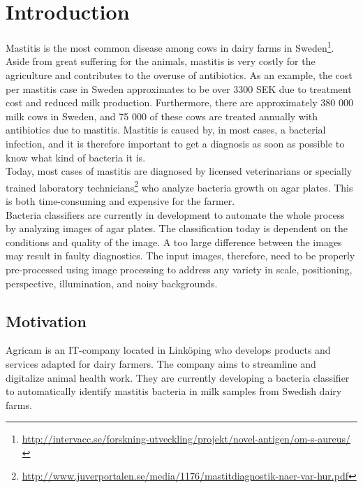 \chapter{Introduction}
Mastitis is the most common disease among cows in dairy farms in Sweden\footnote{\url{http://intervacc.se/forskning-utveckling/projekt/novel-antigen/om-s-aureus/}}. Aside from great suffering for the animals, mastitis is very costly for the agriculture and contributes to the overuse of antibiotics. As an example, the cost per mastitis case in Sweden approximates to be over 3300 SEK due to treatment cost and reduced milk production. Furthermore, there are approximately 380 000 milk cows in Sweden, and 75 000 of these cows are treated annually with antibiotics due to mastitis. Mastitis is caused by, in most cases, a bacterial infection, and it is therefore important to get a diagnosis as soon as possible to know what kind of bacteria it is. \\ 

\noindent Today, most cases of mastitis are diagnosed by licensed veterinarians or specially trained laboratory technicians\footnote{\url{http://www.juverportalen.se/media/1176/mastitdiagnostik-naer-var-hur.pdf}} who analyze bacteria growth on agar plates. This is both time-consuming and expensive for the farmer. \\

\noindent Bacteria classifiers are currently in development to automate the whole process by analyzing images of agar plates. The classification today is dependent on the conditions and quality of the image. A too large difference between the images may result in faulty diagnostics. The input images, therefore, need to be properly pre-processed using image processing to address any variety in scale, positioning, perspective, illumination, and noisy backgrounds.  


\section{Motivation}
Agricam is an IT-company located in Linköping who develops products and services adapted for dairy farmers. The company aims to streamline and digitalize animal health work. They are currently developing a bacteria classifier to automatically identify mastitis bacteria in milk samples from Swedish dairy farms. \\

